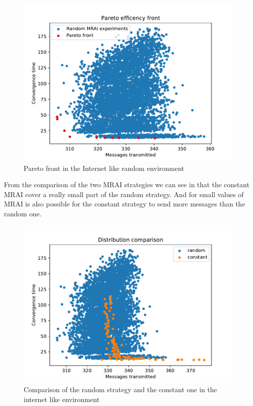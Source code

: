 \documentclass[10pt,conference,letterpaper]{IEEEtran}
\newcommand{\figwidth}{0.78}
\newcommand{\figvspace}{-1.5em}
\begin{document}
\begin{figure}[tb]
	\centering
	\includegraphics[width=\figwidth\columnwidth]{images/internet_like/graph-100-random/random-multiple_mrais}
	\caption{Pareto front in the Internet like random environment}
	\label{fig:random_mrai_pareto_freq}
	\vspace{\figvspace}
\end{figure}

From the comparison of the two \ac{MRAI} strategies we can see in 
that the constant \ac{MRAI} cover a really small part of the random strategy.
And for small values of \ac{MRAI} is also possible for the constant strategy
to send more messages than the random one.

\begin{figure}[tb]
	\centering
	\includegraphics[width=\figwidth\columnwidth]{images/internet_like/combine_results_2}
	\caption{Comparison of the random strategy and the constant one in the internet like environment}
	\label{fig:internet_pareto_comparison}
	\vspace{\figvspace}
\end{figure}



\end{document}
